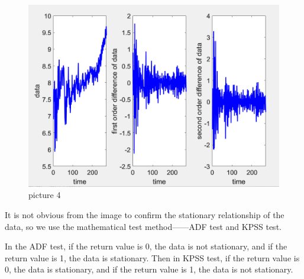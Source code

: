 \documentclass{apmcmthesis}
\begin{document}
\begin{figure}[htbp]
  \centering
  \includegraphics[scale=0.35]{Smoothness Analysis.png}
  \caption{picture 4}
\end{figure}

It is not obvious from the image to confirm the stationary relationship of the data, so we use the mathematical test method——ADF test and KPSS test.

In the ADF test, if the return value is 0, the data is not stationary, and if the return value is 1, the data is stationary. Then in KPSS test, if the return value is 0, the data is stationary, and if the return value is 1, the data is not stationary.
\end{document}
